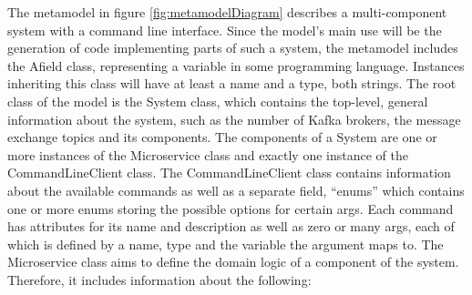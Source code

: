 \documentclass[parskip=full]{article}
\begin{document}
    The metamodel in figure \ref{fig:metamodelDiagram} describes a multi-component system with a command line interface.
    Since the model's main use will be the generation of code implementing parts of such a system, the metamodel includes the Afield class, representing a variable in some programming language.
    Instances inheriting this class will have at least a name and a type, both strings.
    The root class of the model is the System class, which contains the top-level, general information about the system, such as the number of Kafka brokers, the message exchange topics and its components.
    The components of a System are one or more instances of the Microservice class and exactly one instance of the CommandLineClient class.
    The CommandLineClient class contains information about the available commands as well as a separate field, ``enums'' which contains one or more enums storing the possible options for certain args.
    Each command has attributes for its name and description as well as zero or many args, each of which is defined by a name, type and the variable the argument maps to.
    The Microservice class aims to define the domain logic of a component of the system.
    Therefore, it includes information about the following:
\end{document}
